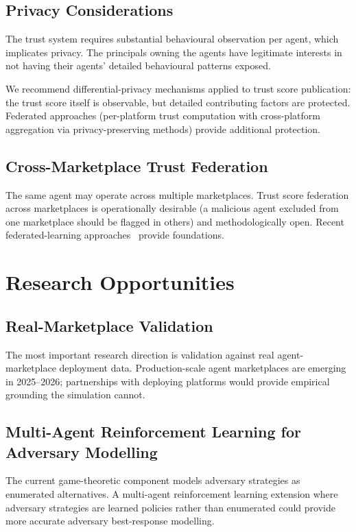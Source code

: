 \documentclass[sigconf,nonacm]{acmart}
\begin{document}
\subsection{Privacy Considerations}

The trust system requires substantial behavioural observation per
agent, which implicates privacy. The principals owning the agents
have legitimate interests in not having their agents'
detailed behavioural patterns exposed.

We recommend differential-privacy mechanisms applied to trust
score publication: the trust score itself is observable, but
detailed contributing factors are protected. Federated approaches
(per-platform trust computation with cross-platform aggregation
via privacy-preserving methods) provide additional protection.

\subsection{Cross-Marketplace Trust Federation}

The same agent may operate across multiple marketplaces. Trust
score federation across marketplaces is operationally desirable
(a malicious agent excluded from one marketplace should be
flagged in others) and methodologically open. Recent
federated-learning approaches~\cite{kairouz2024fedml} provide
foundations.

\section{Research Opportunities}

\subsection{Real-Marketplace Validation}

The most important research direction is validation against real
agent-marketplace deployment data. Production-scale agent
marketplaces are emerging in 2025--2026; partnerships with
deploying platforms would provide empirical grounding the
simulation cannot.

\subsection{Multi-Agent Reinforcement Learning for Adversary Modelling}

The current game-theoretic component models adversary strategies
as enumerated alternatives. A multi-agent reinforcement learning
extension where adversary strategies are learned policies rather
than enumerated could provide more accurate adversary best-response
modelling.
\end{document}
